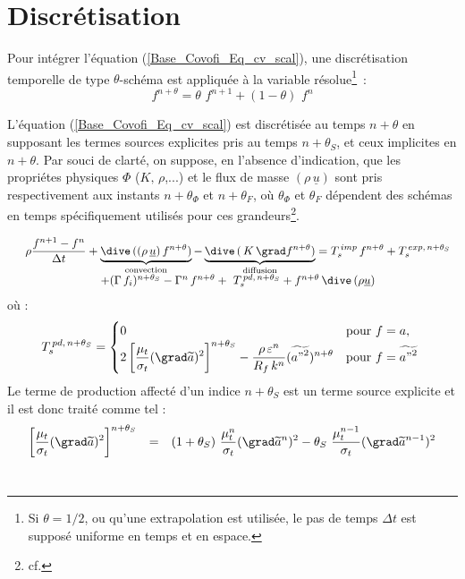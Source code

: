 \section*{Discr\'etisation}
Pour int\'{e}grer l'\'{e}quation (\ref{Base_Covofi_Eq_cv_scal}), une discr\'{e}tisation temporelle de
type $\theta$-sch\'{e}ma est appliqu\'{e}e \`{a} la variable r\'{e}solue\footnote{Si
$\theta=1/2$, ou qu'une extrapolation est utilis\'{e}e, le pas de temps $\Delta t$
est suppos\'{e} uniforme en temps et en espace.}~:
\begin{equation}
f^{n+\theta} = \theta \,\, f^{n+1} + (1-\theta)\,\, f^{n}
\end{equation}

L'\'{e}quation (\ref{Base_Covofi_Eq_cv_scal}) est discr\'etis\'ee au temps $n+\theta$ en
supposant les termes sources explicites pris au temps $n+\theta_{S}$, et ceux
implicites en $n+\theta$.
Par souci de clart\'{e}, on suppose, en l'absence d'indication, que les propri\'{e}tes
physiques $\Phi$ ($K,\,\rho$,...) et le flux de masse $(\rho\,\underline{u})$
sont pris respectivement aux instants $n+\theta_\Phi$ et $n+\theta_F$, o\`{u}
$\theta_\Phi$ et $\theta_F$ d\'{e}pendent des sch\'{e}mas en temps sp\'{e}cifiquement
utilis\'{e}s pour ces grandeurs\footnote{cf. }.

\begin{equation}
\begin{array}{lcl}
&\displaystyle
 \rho \frac {f^{n+1}-f^{n}}{\Delta t} +
\underbrace{\dive\,((\rho\,\underline{u})\,f^{n+\theta})}_{\text{convection}}
- \underbrace{\dive\,(\,K\,\grad f^{n+\theta})}_{\text{diffusion}} =
T_s^{\,imp}\,f^{n+\theta} + T_s^{\,exp,\,n+\theta_{S}}\\
& + (\Gamma\,f_i)^{n+\theta_{S}}-\Gamma^{n}\,f^{n+\theta} +\
T_s^{\,pd,\,n+\theta_S} + f^{n+\theta}\,\dive\,(\rho\underline{u})
\end{array}
\end{equation}
o\`{u} :
\begin{equation}
 T_s^{\,pd,\,n+\theta_S} =
\begin{cases}
0 & \text{pour $f=a$}, \\
2 \displaystyle \left[\frac{\mu_t}{\sigma_t}(\grad \widetilde{a})^2\right]^{n+\theta_S}-\frac{\rho\,
\varepsilon^{n}}{R_f\,k^{n}}(\widetilde{{a"}^2})^{n+\theta}& \text{pour $f=\widetilde{{a"}^2}$ }
\end{cases}
\end{equation}
Le terme de production affect\'{e} d'un indice $n+\theta_{S}$ est un terme source
explicite et il est donc trait\'{e} comme tel :
\begin{equation}
\begin{array}{rll}
\displaystyle
\left[\frac{\mu_t}{\sigma_t}(\grad
\widetilde{a})^2\right]^{n+\theta_{S}}&=&\displaystyle
(1+\theta_{S})\,\,\frac{\mu_t^{n}}{\sigma_t}(\grad
\widetilde{a}^{n})^2-\theta_{S}\,\,\frac{\mu_t^{n-1}}{\sigma_t}(\grad
\widetilde{a}^{n-1})^2\\
\end{array}
\end{equation}
\\

